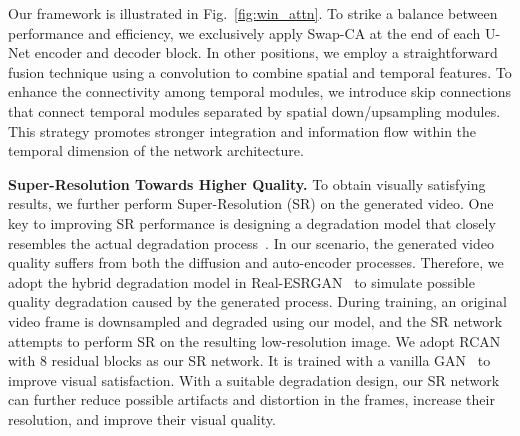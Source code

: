 \documentclass{article}
\begin{document}
Our framework is illustrated in Fig.~\ref{fig:win_attn}.
To strike a balance between performance and efficiency, we exclusively apply Swap-CA at the end of each U-Net encoder and decoder block. In other positions, we employ a straightforward fusion technique using a  convolution to combine spatial and temporal features.
To enhance the connectivity among temporal modules, we introduce skip connections that connect temporal modules separated by spatial down/upsampling modules.
This strategy promotes stronger integration and information flow within the temporal dimension of the network architecture.

 

\noindent\textbf{Super-Resolution Towards Higher Quality.}
To obtain visually satisfying results, we further perform Super-Resolution (SR) on the generated video. One key to improving SR performance is designing a degradation model that closely resembles the actual degradation process~\cite{SR1,SR2,SR3,SR4,SR5,SR6}. In our scenario, the generated video quality suffers from both the diffusion and auto-encoder processes. Therefore, we adopt the hybrid degradation model in Real-ESRGAN~\cite{Wang_2021_RealESRGAN_ICCV} to simulate possible quality degradation caused by the generated process. 
During training, an original video frame is downsampled and degraded using our model, and the SR network attempts to perform SR on the resulting low-resolution image. 
We adopt RCAN~\cite{zhang2018_RCAN} with 8 residual blocks as our SR network. It is trained with a vanilla GAN~\cite{GAN} to improve visual satisfaction. With a suitable degradation design, our SR network can further reduce possible artifacts and distortion in the frames, increase their resolution, and improve their visual quality.
\end{document}
